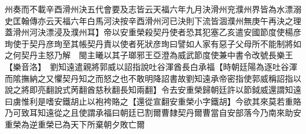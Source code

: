 州奏而不載辛酉滑州決五代會要及志皆云天福六年九月決滑州兖濮州界皆為水漂溺史匡翰傳亦云天福六年白馬河決按辛酉滑州河已決則下流皆涸濮州無庚午再決之理蓋滑州河決漂浸及濮州耳】帝以安重榮殺契丹使者恐其犯塞乙亥遣安國節度使楊彦珣使于契丹彦珣至其帳契丹責以使者死狀彦珣曰譬如人家有惡子父母所不能制將如之何契丹主怒乃解　閩主曦以其子瑯邪王亞澄為威武節度使兼中書令改號長樂王【樂音洛】　劉知遠遣親將郭威以詔指說吐谷渾酋長白承福【時朝廷陽為逐吐谷渾而隂撫納之又懼契丹知之而怒之也不敢明降詔書故劉知遠承帝密指使郭威稱詔指以說之將即亮翻說式苪翻酋慈秋翻長知兩翻】令去安重榮歸朝廷許以節鉞威還謂知遠曰虜惟利是嗜安鐵胡止以袍袴賂之【還從宣翻安重榮小字鐵胡】今欲其來莫若重賂乃可致耳知遠從之且使謂承福曰朝廷已割爾曹隸契丹爾曹當自安部落今乃南來助安重榮為逆重榮已為天下所棄朝夕敗亡爾